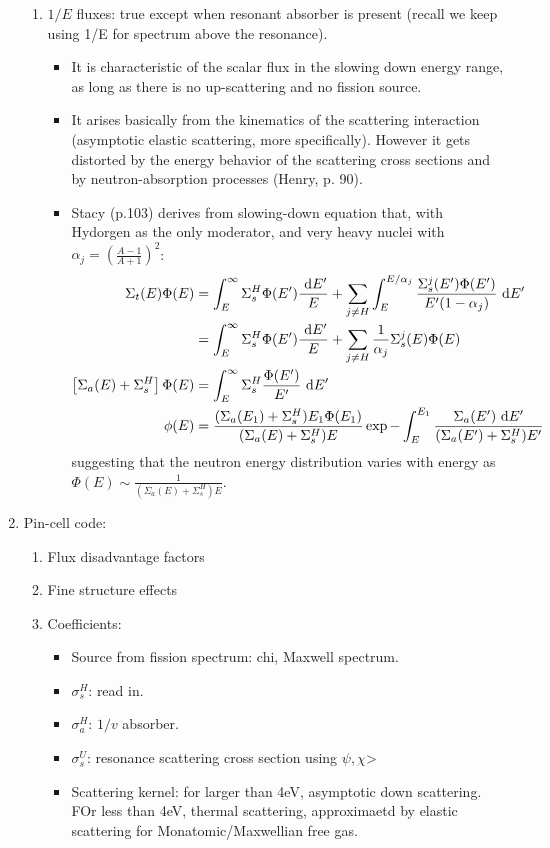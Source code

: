 \documentclass{school-22.211-notes}
\begin{document}
\begin{enumerate}
\begin{enumerate}
    \item $1/E$ fluxes: true except when resonant absorber is present (recall we keep using 1/E for spectrum above the resonance). 
  \begin{itemize}
  \item It is characteristic of the scalar flux in the slowing down energy range, as long as there is no up-scattering and no fission source. 
  \item It arises basically from the kinematics of the scattering interaction (asymptotic elastic scattering, more specifically). However it gets distorted by the energy behavior of the scattering cross sections and by neutron-absorption processes (Henry, p. 90). 
  \item Stacy (p.103) derives from slowing-down equation that, with Hydorgen as the only moderator, and very heavy nuclei with $\alpha_j = \left(\frac{A-1}{A+1} \right)^2$:
    \begin{align}
      \Sigma_t(E) \Phi(E) &= \int_E^{\infty} \Sigma_s^H \Phi(E')\frac{\mbox{ }\mathrm{d} E'}{E} + \displaystyle\sum_{j\neq H} \int_E^{E/\alpha_j} \frac{\Sigma_s^j (E') \Phi(E')}{E'(1-\alpha_j)} \mbox{ }\mathrm{d} E' \\
      &=  \int_E^{\infty} \Sigma_s^H \Phi(E')\frac{\mbox{ }\mathrm{d} E'}{E} + \displaystyle\sum_{j\neq H} \frac{1}{\alpha_j} \Sigma_s^j (E) \Phi(E) \\
      \left[ \Sigma_a (E) + \Sigma_s^H \right] \Phi(E) &= \int_E^{\infty} \Sigma_s^H \frac{\Phi(E')}{E'} \mbox{ }\mathrm{d} E' \\
      \phi(E) &= \frac{(\Sigma_a (E_1) + \Sigma_s^H) E_1 \Phi (E_1) }{(\Sigma_a(E) + \Sigma_s^H) E} \exp{ - \int_E^{E_1} \frac{\Sigma_a (E') \mbox{ }\mathrm{d}E'}{(\Sigma_a(E') + \Sigma_s^H) E'} }
    \end{align} 
    suggesting that the neutron energy distribution varies with energy as $\Phi(E) \sim \frac{1}{(\Sigma_a(E) + \Sigma_s^H) E}$. 
  \end{itemize}
  \end{enumerate}

\item Pin-cell code: 
  \begin{enumerate}
    \item Flux disadvantage factors
    \item Fine structure effects
    \item Coefficients: 
      \begin{itemize}
        \item Source from fission spectrum: chi, Maxwell spectrum.
        \item $\sigma_s^H$: read in.
        \item $\sigma_a^H$: $1/v$ absorber.
        \item $\sigma_s^U$: resonance scattering cross section using $\psi, \chi$>
        \item Scattering kernel: for larger than 4eV, asymptotic down scattering. FOr less than 4eV, thermal scattering, approximaetd by elastic scattering for Monatomic/Maxwellian free gas. 
      \end{itemize}
  \end{enumerate}
\end{enumerate}
\end{document}
